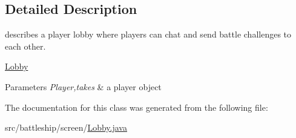 \subsection{Detailed Description}
describes a player lobby where players can chat and send battle challenges to each other. 

\hyperlink{classbattleship_1_1screen_1_1Lobby}{Lobby}


\begin{DoxyParams}{Parameters}
{\em Player,takes} & a player object \\
\hline
\end{DoxyParams}


The documentation for this class was generated from the following file\+:\begin{DoxyCompactItemize}
\item 
src/battleship/screen/\hyperlink{Lobby_8java}{Lobby.\+java}\end{DoxyCompactItemize}
